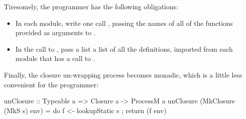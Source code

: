 \documentclass[preprint]{sigplanconf}
\begin{document}
Tiresomely, the programmer has the following obligations:
\begin{itemize}
\item In each module, write one call ,
passing the names of all of the functions provided as arguments to .
\item In the call to , pass a list
a list of all the  definitions, imported from
each module that has a call to .
\end{itemize}

Finally, the closure un-wrapping process becomes monadic, which is
a little less convenient for the programmer:
\begin{code}
  unClosure :: Typeable a => Closure a -> ProcessM a
  unClosure (MkClosure (MkS s) env)
        = do { f <- lookupStatic s
             ; return (f env) }
\end{code}
\end{document}
